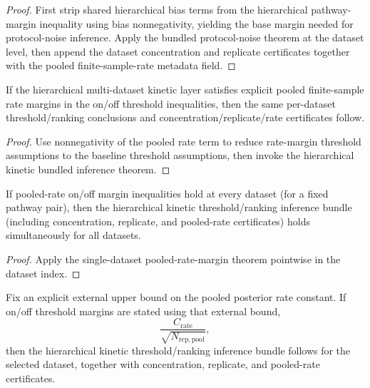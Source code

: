 \begin{proof}
First strip shared hierarchical bias terms from the hierarchical pathway-margin inequality using bias nonnegativity, yielding the base margin needed for protocol-noise inference. Apply the bundled protocol-noise theorem at the dataset level, then append the dataset concentration and replicate certificates together with the pooled finite-sample-rate metadata field.
\end{proof}

\begin{theorem}\label{thm:hierarchical-kinetic-replicate-inference-rate-margins}
If the hierarchical multi-dataset kinetic layer satisfies explicit pooled finite-sample rate margins in the on/off threshold inequalities, then the same per-dataset threshold/ranking conclusions and concentration/replicate/rate certificates follow.
\end{theorem}

\begin{proof}
Use nonnegativity of the pooled rate term to reduce rate-margin threshold assumptions to the baseline threshold assumptions, then invoke the hierarchical kinetic bundled inference theorem.
\end{proof}

\begin{theorem}\label{thm:hierarchical-kinetic-replicate-inference-rate-margins-all-datasets}
If pooled-rate on/off margin inequalities hold at every dataset (for a fixed pathway pair), then the hierarchical kinetic threshold/ranking inference bundle (including concentration, replicate, and pooled-rate certificates) holds simultaneously for all datasets.
\end{theorem}

\begin{proof}
Apply the single-dataset pooled-rate-margin theorem pointwise in the dataset index.
\end{proof}

\begin{theorem}\label{thm:hierarchical-kinetic-replicate-inference-rate-constant-margins}
Fix an explicit external upper bound on the pooled posterior rate constant. If on/off threshold margins are stated using that external bound,
\[
\frac{C_{\mathrm{rate}}}{\sqrt{N_{\mathrm{rep,pool}}}},
\]
then the hierarchical kinetic threshold/ranking inference bundle follows for the selected dataset, together with concentration, replicate, and pooled-rate certificates.
\end{theorem}

